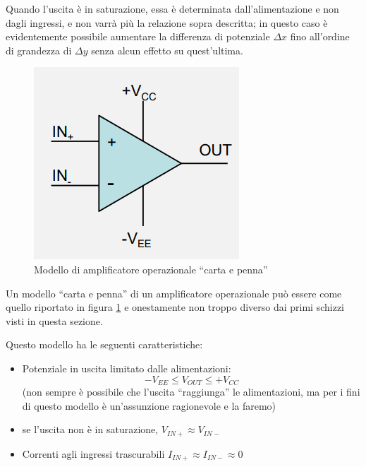 \documentclass{article}
\begin{document}
\vspace{2mm}

Quando l'uscita è in saturazione, essa è determinata dall'alimentazione e non dagli ingressi, e non varrà più la relazione sopra descritta; in questo caso è evidentemente possibile aumentare la differenza di potenziale $\Delta x$ fino all'ordine di grandezza di $\Delta y$ senza alcun effetto su quest'ultima.

\begin{figure}[h]
  \centering
  \includegraphics[scale=0.45]{IM_amplificatore_operazionale_carta_e_penna}
  \caption{Modello di amplificatore operazionale ``carta e penna''}
  \label{Schema_amplificatore_operazionale_carta_e_penna}
\end{figure}
Un modello ``carta e penna'' di un amplificatore operazionale può essere come quello riportato in figura \ref{Schema_amplificatore_operazionale_carta_e_penna} e onestamente non troppo diverso dai primi schizzi visti in questa sezione.

Questo modello ha le seguenti caratteristiche: 
\begin{itemize}
  \item Potenziale in uscita limitato dalle alimentazioni:
  \[-V_{EE} \leq V_{OUT} \leq + V_{CC}\]
  (non sempre è possibile che l'uscita ``raggiunga'' le alimentazioni, ma per i fini di questo modello è un'assunzione ragionevole e la faremo)
  \item se l'uscita non è in saturazione, $V_{IN+} \approx V_{IN-}$
  \item Correnti agli ingressi trascurabili $I_{IN+} \approx I_{IN-} \approx 0$
\end{itemize}
\end{document}
